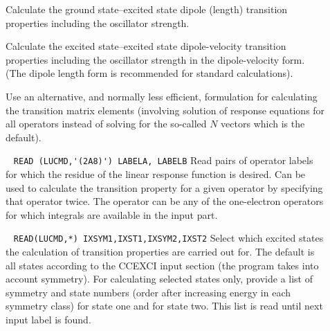 \begin{description}

\item[]
%
Calculate the ground state--excited state dipole (length) transition properties including
the oscillator strength.
%
\item[]
%
Calculate the excited state--excited state dipole-velocity  transition properties including
the oscillator strength in the dipole-velocity form. (The dipole length form is recommended
for standard calculations).
%
\item[]
%
Use an alternative, and normally less efficient, formulation for calculating
the transition matrix elements (involving solution of response equations for
all operators instead of solving for the so-called $N$ vectors which is the default).
%
\item[]\verb| |  \newline
\verb|READ (LUCMD,'(2A8)') LABELA, LABELB|\newline
%
Read pairs of operator labels for which the residue of the linear response
function is desired.
Can be used to calculate the transition property for a given operator
by specifying that operator twice. The operator can be any of the one-electron
operators for which integrals are available in the  input part.
%
\item[] \verb| | \newline
\verb|READ(LUCMD,*) IXSYM1,IXST1,IXSYM2,IXST2|\newline 
%
Select which excited states the calculation of transition properties
are carried out for. The default is all states according to the CCEXCI input section
(the program takes into account symmetry). For calculating selected states only,
provide a list of symmetry and state numbers (order after increasing energy in
each symmetry class) for state one and for state two.
This list is read until next input label is found.

\end{description}

